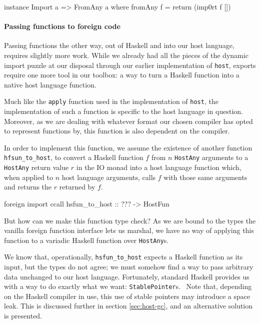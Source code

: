 \documentclass{sigplanconf}
\begin{document}
\begin{code}
  instance Import a => FromAny a where
    fromAny f = return (imp0rt f [])
\end{code}

\paragraph{Passing functions to foreign code}
Passing functions the other way, out of Haskell and into our host language,
requires slightly more work. While we already had all the pieces of the
dynamic import puzzle at our disposal through our earlier implementation of
\lstinline!host!, exports require one more tool in our toolbox: a way to turn
a Haskell function into a native host language function.

Much like the \lstinline!apply! function used in the implementation of
\lstinline!host!, the implementation of such a function is specific to the
host language in question. Moreover, as we are dealing with whatever format
our chosen compiler has opted to represent functions by, this function is also
dependent on the compiler.

In order to implement this function, we assume the existence of another
function \lstinline!hfsun_to_host!, to convert a Haskell function $f$ from $n$
\lstinline!HostAny! arguments to a \lstinline!HostAny! return value $r$ in the
IO monad into a host language function which, when applied to $n$ host
language arguments, calls $f$ with those same arguments and returns the $r$
returned by $f$.

\begin{code}
  foreign import ccall
    hsfun_to_host :: ??? -> HostFun
\end{code}

But how can we make this function type check?
As we are bound to the types the vanilla foreign function interface lets us
marshal, we have no way of applying this function to a variadic Haskell
function over \lstinline!HostAny!s.

We know that, operationally, \lstinline!hsfun_to_host! expects a Haskell
function as its input, but the types do not agree; we must somehow find a way
to pass arbitrary data unchanged to our host language.
Fortunately, standard Haskell provides us with a way to do exactly what we want:
\lstinline!StablePointer!s.\ \cite{stableptr} Note that, depending on the
Haskell compiler in use, this use of stable pointers may introduce a space
leak. This is discussed further in section \ref{sec:host-gc}, and an
alternative solution is presented.
\end{document}
